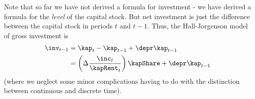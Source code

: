 Note that so far we have not derived a formula for investment - we
have derived a formula for the {\it level} of the capital stock.  But
net investment is just the difference between the capital stock in
periods $t$ and $t-1$.  Thus, the Hall-Jorgenson model of gross investment is
\begin{equation}\begin{gathered}\begin{aligned}
        \inv_{t-1} & =  \kap_{t}-\kap_{t-1}+\depr \kap_{t-1}  \\
         & =  \left(\Delta \frac{\inc_{t}}{\kapRent_{t}}\right)\kapShare+\depr \kap_{t-1}
\end{aligned}\end{gathered}\end{equation}
(where we neglect some minor complications having to do with the distinction between
continuous and discrete time).

